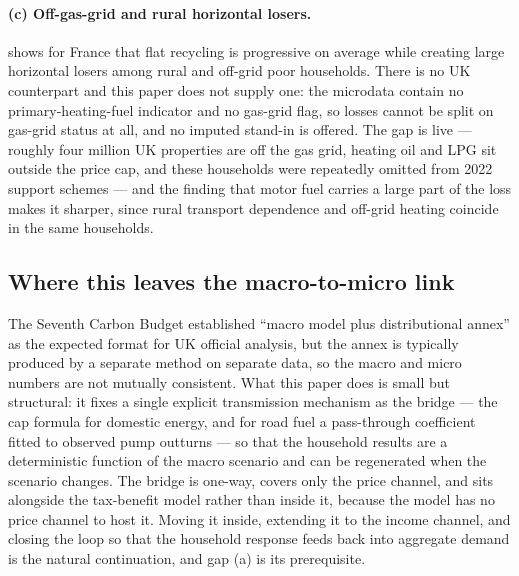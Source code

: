 \paragraph{(c) Off-gas-grid and rural horizontal losers.} \citet{douenne2020} shows for France that flat recycling is progressive on average while creating large horizontal losers among rural and off-grid poor households. There is no UK counterpart and this paper does not supply one: the microdata contain no primary-heating-fuel indicator and no gas-grid flag, so losses cannot be split on gas-grid status at all, and no imputed stand-in is offered. The gap is live --- roughly four million UK properties are off the gas grid, heating oil and LPG sit outside the price cap, and these households were repeatedly omitted from 2022 support schemes --- and the finding that motor fuel carries a large part of the loss makes it sharper, since rural transport dependence and off-grid heating coincide in the same households.

\subsection{Where this leaves the macro-to-micro link}

The Seventh Carbon Budget established ``macro model plus distributional annex'' as the expected format for UK official analysis, but the annex is typically produced by a separate method on separate data, so the macro and micro numbers are not mutually consistent. What this paper does is small but structural: it fixes a single explicit transmission mechanism as the bridge --- the cap formula for domestic energy, and for road fuel a pass-through coefficient fitted to observed pump outturns --- so that the household results are a deterministic function of the macro scenario and can be regenerated when the scenario changes. The bridge is one-way, covers only the price channel, and sits alongside the tax-benefit model rather than inside it, because the model has no price channel to host it. Moving it inside, extending it to the income channel, and closing the loop so that the household response feeds back into aggregate demand is the natural continuation, and gap (a) is its prerequisite.
